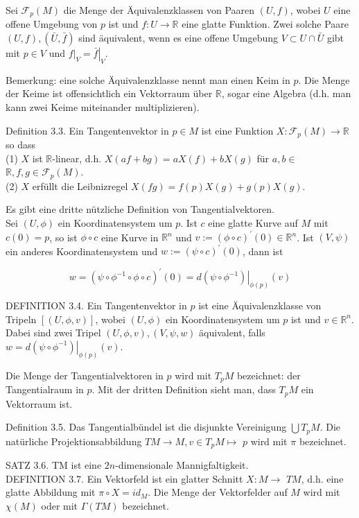 \documentclass[10pt, letterpaper]{article}
\begin{document}
Sei $\mathcal{F}_{p}(M)$ die Menge der Äquivalenzklassen von Paaren $(U, f)$, wobei $U$ eine offene Umgebung von $p$ ist und $f: U \rightarrow \mathbb{R}$ eine glatte Funktion. Zwei solche Paare $(U, f),(\bar{U}, \bar{f})$ sind äquivalent, wenn es eine offene Umgebung $V \subset U \cap \bar{U}$ gibt mit $p \in V$ und $\left.f\right|_{V}=\left.\bar{f}\right|_{V}$.

Bemerkung: eine solche Äquivalenzklasse nennt man einen Keim in $p$. Die Menge der Keime ist offensichtlich ein Vektorraum über $\mathbb{R}$, sogar eine Algebra (d.h. man kann zwei Keime miteinander multiplizieren).

Definition 3.3. Ein Tangentenvektor in $p \in M$ ist eine Funktion $X: \mathcal{F}_{p}(M) \rightarrow \mathbb{R}$ so dass\\
(1) $X$ ist $\mathbb{R}$-linear, d.h. $X(a f+b g)=a X(f)+b X(g)$ für $a, b \in$ $\mathbb{R}, f, g \in \mathcal{F}_{p}(M)$.\\
(2) $X$ erfüllt die Leibnizregel $X(f g)=f(p) X(g)+g(p) X(g)$.

Es gibt eine dritte nützliche Definition von Tangentialvektoren.\\
Sei $(U, \phi)$ ein Koordinatensystem um $p$. Ist $c$ eine glatte Kurve auf $M$ mit $c(0)=p$, so ist $\phi \circ c$ eine Kurve in $\mathbb{R}^{n}$ und $v:=(\phi \circ c)^{\prime}(0) \in \mathbb{R}^{n}$. Ist $(V, \psi)$ ein anderes Koordinatensystem und $w:=(\psi \circ c)^{\prime}(0)$, dann ist

$$
w=\left(\psi \circ \phi^{-1} \circ \phi \circ c\right)^{\prime}(0)=\left.d\left(\psi \circ \phi^{-1}\right)\right|_{\phi(p)}(v)
$$

DEFINITION 3.4. Ein Tangentenvektor in $p$ ist eine Äquivalenzklasse von Tripeln $[(U, \phi, v)]$, wobei $(U, \phi)$ ein Koordinatensystem um $p$ ist und $v \in \mathbb{R}^{n}$. Dabei sind zwei Tripel $(U, \phi, v),(V, \psi, w)$ äquivalent, falls $w=\left.d\left(\psi \circ \phi^{-1}\right)\right|_{\phi(p)}(v)$.

Die Menge der Tangentialvektoren in $p$ wird mit $T_{p} M$ bezeichnet: der Tangentialraum in $p$. Mit der dritten Definition sieht man, dass $T_{p} M$ ein Vektorraum ist.

Definition 3.5. Das Tangentialbündel ist die disjunkte Vereinigung $\bigcup T_{p} M$. Die natürliche Projektionsabbildung $T M \rightarrow M, v \in T_{p} M \mapsto$ $p$ wird mit $\pi$ bezeichnet.

SATZ 3.6. TM ist eine $2 n$-dimensionale Mannigfaltigkeit.\\
DEFINITION 3.7. Ein Vektorfeld ist ein glatter Schnitt $X: M \rightarrow$ $T M$, d.h. eine glatte Abbildung mit $\pi \circ X=i d_{M}$. Die Menge der Vektorfelder auf $M$ wird mit $\chi(M)$ oder mit $\Gamma(T M)$ bezeichnet.
\end{document}
